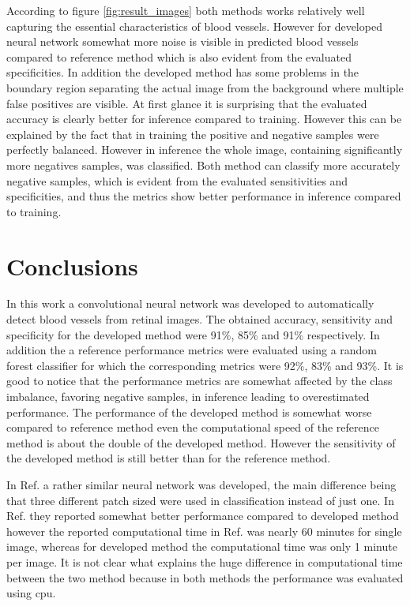 \documentclass[aps,prb,10pt,twocolumn,groupedaddress]{revtex4-1}
\begin{document}
According to figure \ref{fig:result_images} both methods works relatively well capturing the essential characteristics of blood vessels. However for developed neural network somewhat more noise is visible in predicted blood vessels compared to reference method which is also evident from the evaluated specificities. In addition the developed method has some problems in the boundary region separating the actual image from the background where multiple false positives are visible. At first glance it is surprising that the evaluated accuracy is clearly better for inference compared to training. However this can be explained by the fact that in training the positive and negative samples were perfectly balanced. However in inference the whole image, containing significantly more negatives samples, was classified. Both method can classify more accurately negative samples, which is evident from the evaluated sensitivities and specificities, and thus the metrics show better performance in inference compared to training. 

\section{Conclusions}
\label{sec:conclusions}
In this work a convolutional neural network was developed to automatically detect blood vessels from retinal images. The obtained accuracy, sensitivity and specificity for the developed method were 91\%, 85\% and 91\% respectively. In addition the a reference performance metrics were evaluated using a random forest classifier for which the corresponding metrics were 92\%, 83\% and 93\%. It is good to notice that the performance metrics are somewhat affected by the class imbalance, favoring negative samples, in inference leading to overestimated performance. The performance of the developed method is somewhat worse compared to reference method even the computational speed of the reference method is about the double of the developed method. However the sensitivity of the developed method is still better than for the reference method.

In Ref. \cite{tan} a rather similar neural network was developed, the main difference being that three different patch sized were used in classification instead of just one. In Ref. \cite{tan} they reported somewhat better performance compared to developed method however the reported computational time in Ref. \cite{tan} was nearly 60 minutes for single image, whereas for developed method the computational time was only 1 minute per image. It is not clear what explains the huge difference in computational time between the two method because in both methods the performance was evaluated using cpu.
\end{document}
